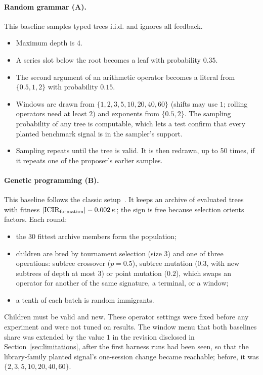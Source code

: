 \paragraph{Random grammar (A).} This baseline samples typed trees i.i.d. and
ignores all feedback.
\begin{itemize}
  \item Maximum depth is 4.
  \item A series slot below the root becomes a leaf with probability $0.35$.
  \item The second argument of an arithmetic operator becomes a literal from
    $\{0.5,1,2\}$ with probability $0.15$.
  \item Windows are drawn from $\{1,2,3,5,10,20,40,60\}$ (shifts may use
    $1$; rolling operators need at least $2$) and exponents from
    $\{0.5,2\}$. The sampling probability of any tree is computable, which
    lets a test confirm that every planted benchmark signal is in the
    sampler's support.
  \item Sampling repeats until the tree is valid. It is then redrawn, up to
    50 times, if it repeats one of the proposer's earlier samples.
\end{itemize}

\paragraph{Genetic programming (B).} This baseline follows the classic
setup~\citep{koza1992genetic}. It keeps an archive of evaluated trees with
fitness $|\mathrm{ICIR}_{\mathrm{formation}}|-0.002\,\kappa$; the sign is free
because selection orients factors. Each round:
\begin{itemize}
  \item the 30 fittest archive members form the population;
  \item children are bred by tournament selection (size 3) and one of three
    operations: subtree crossover ($p=0.5$), subtree mutation ($0.3$, with
    new subtrees of depth at most 3) or point mutation ($0.2$), which swaps
    an operator for another of the same signature, a terminal, or a window;
  \item a tenth of each batch is random immigrants.
\end{itemize}
Children must be valid and new. These operator settings were fixed before
any experiment and were not tuned on results. The window menu that both
baselines share was extended by the value $1$ in the revision disclosed in
Section~\ref{sec:limitations}, after the first harness runs had been seen,
so that the library-family planted signal's one-session change became
reachable; before, it was $\{2,3,5,10,20,40,60\}$.

